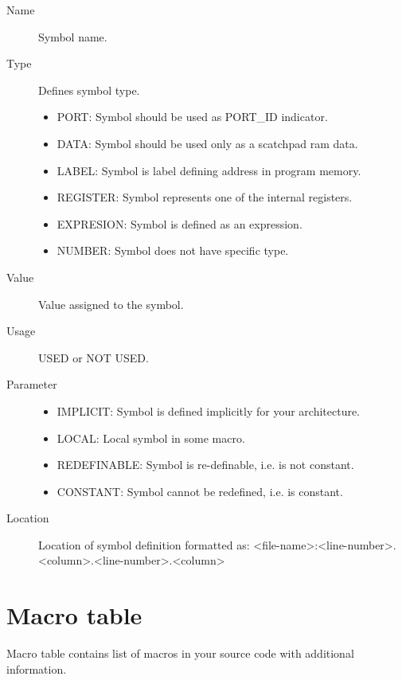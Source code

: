     \begin{description}
        \item[Name]
            Symbol name.

        \item[Type]
            Defines symbol type.
            \begin{itemize}
                \item PORT: Symbol should be used as PORT\_ID indicator.
                \item DATA: Symbol should be used only as a scatch\-pad ram data.
                \item LABEL: Symbol is label defining address in program memory.
                \item REGISTER: Symbol represents one of the internal registers.
                \item EXPRESION: Symbol is defined as an expression.
                \item NUMBER: Symbol does not have specific type.
            \end{itemize}

        \item[Value]
            Value assigned to the symbol.

        \item[Usage]
            USED or NOT USED.

        \item[Parameter]
            \begin{itemize}
                \item IMPLICIT: Symbol is defined implicitly for your architecture.
                \item LOCAL: Local symbol in some macro.
                \item REDEFINABLE: Symbol is re-definable, i.e. is not constant.
                \item CONSTANT: Symbol cannot be redefined, i.e. is constant.
            \end{itemize}

        \item[Location]
            Location of symbol definition formatted as: <file-name>:<line-number>.<column>.<line-number>.<column>
    \end{description}

\section{Macro table}
    Macro table contains list of macros in your source code with additional information.\\

